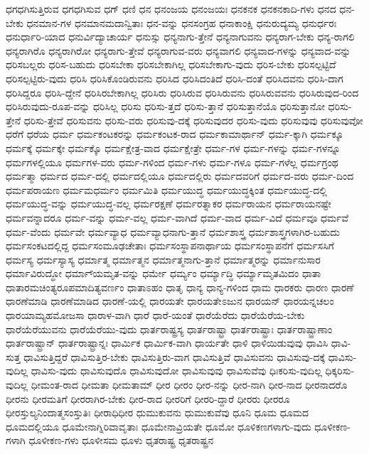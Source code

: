 {ಧಗಧಗಿಸುತ್ತಿರುವ
ಧಗಧಗಿಸುವ
ಧಗ್
ಧಣಿ
ಧನ
ಧನಂಜಯ
ಧನಂಜಯಃ
ಧನಕನಕ
ಧನಕನಕಾದಿ-ಗಳು
ಧನದ
ಧನ-ಬೇಕು
ಧನಮಾನ-ಗಳ
ಧನಮಾನಮದಾನ್ವಿತಾಃ
ಧನ-ವನ್ನು
ಧನಸಂಗ್ರಹ
ಧನಾಕಾಂಕ್ಷಿ
ಧನುರುದ್ಯಮ್ಯ
ಧನುರ್ಧರಃ
ಧನುರ್ಧಾರಿ-ಯಾದ
ಧನುರ್ವಿದ್ಯಾಚಾರ್ಯ
ಧನುಸ್ಸು
ಧನ್ಯನಾಗು-ತ್ತೇನೆ
ಧನ್ಯನಾಗುವನು
ಧನ್ಯರಾಗ-ಬೇಕು
ಧನ್ಯ-ರಾಗಲಿ
ಧನ್ಯರಾಗಿರೊ
ಧನ್ಯರಾಗಿರೋ
ಧನ್ಯರಾಗು-ತ್ತೇವೆ
ಧನ್ಯರಾಗುವ-ವರು
ಧನ್ಯವಾಗಲಿ
ಧನ್ಯವಾದ-ಗಳನ್ನು
ಧನ್ಯವಾದ-ವನ್ನು
ಧರಿಸಬಲ್ಲರು
ಧರಿಸ-ಬಹುದು
ಧರಿಸಬೇಕಾ
ಧರಿಸಬೇಕಾಗಿಲ್ಲ
ಧರಿಸಬೇಕಾಗು-ವುದು
ಧರಿಸ-ಬೇಕು
ಧರಿಸಲ್ಪಟ್ಟಿದೆ
ಧರಿಸಲ್ಪಟ್ಟಿರು-ವುದು
ಧರಿಸಿ
ಧರಿಸಿಕೊಂಡಿರುವನು
ಧರಿಸಿದ
ಧರಿಸಿದಂತಿದೆ
ಧರಿಸಿ-ದಂತೆ
ಧರಿಸಿದವನು
ಧರಿಸಿ-ದಾಗ
ಧರಿಸಿದ್ದರೂ
ಧರಿಸಿ-ದ್ದೇನೆ
ಧರಿಸಿರಬೇಕಾಗಿಲ್ಲ
ಧರಿಸಿರು
ಧರಿಸಿರುವ
ಧರಿಸಿರುವನು
ಧರಿಸಿರುವವನು
ಧರಿಸಿರುವುದ-ರಿಂದ
ಧರಿಸಿರುವುದು-ರೂಪ-ವನ್ನು
ಧರಿಸಿಲ್ಲ
ಧರಿಸು
ಧರಿಸು-ತ್ತದೆ
ಧರಿಸು-ತ್ತಾನೆ
ಧರಿಸುತ್ತಾನೆಯೊ
ಧರಿಸುತ್ತಾನೋ
ಧರಿಸು-ತ್ತೇನೆ
ಧರಿಸು-ತ್ತೇವೆ
ಧರಿಸುವನು
ಧರಿಸು-ವರು
ಧರಿಸುವು-ದಕ್ಕೆ
ಧರಿಸುವುದರ
ಧರಿಸು-ವುದು
ಧರಿಸುವುವು
ಧರಿಸುವುವೋ
ಧರೆಗೆ
ಧರೆಯ
ಧರ್ಮ
ಧರ್ಮಕಂಟಕರನ್ನು
ಧರ್ಮಕಂಟಕ-ರಾದ
ಧರ್ಮಕಾಮಾರ್ಥಾನ್
ಧರ್ಮ-ಕ್ಕಾಗಿ
ಧರ್ಮಕ್ಕೂ
ಧರ್ಮಕ್ಕೆ
ಧರ್ಮಕ್ಕೇ
ಧರ್ಮಕ್ಕೊ
ಧರ್ಮಕ್ಷೇತ್ರ-ವಾದ
ಧರ್ಮಕ್ಷೇತ್ರೇ
ಧರ್ಮ-ಗಳ
ಧರ್ಮ-ಗಳನ್ನು
ಧರ್ಮ-ಗಳನ್ನೂ
ಧರ್ಮಗಳಲ್ಲಿಯೂ
ಧರ್ಮಗಳ-ವರು
ಧರ್ಮ-ಗಳಿಂದ
ಧರ್ಮ-ಗಳು
ಧರ್ಮ-ಗಳೂ
ಧರ್ಮ-ಗಳೆಲ್ಲ
ಧರ್ಮಗ್ರಂಥ
ಧರ್ಮತ್ಮಾ
ಧರ್ಮದ
ಧರ್ಮ-ದಲ್ಲಿ
ಧರ್ಮದಲ್ಲಿಯೂ
ಧರ್ಮದಲ್ಲಿರು
ಧರ್ಮದವರಿಗೆ
ಧರ್ಮದ-ವರು
ಧರ್ಮ-ದಿಂದ
ಧರ್ಮಪರಾಯಣ
ಧರ್ಮಮಧರ್ಮಂ
ಧರ್ಮಮಿತಿ
ಧರ್ಮಯುದ್ಧ
ಧರ್ಮಯುದ್ಧಕ್ಕಿಂತ
ಧರ್ಮಯುದ್ಧ-ದಲ್ಲಿ
ಧರ್ಮಯುದ್ಧ-ವನ್ನು
ಧರ್ಮಯುದ್ಧ-ವಲ್ಲ
ಧರ್ಮರಕ್ಷಣೆ
ಧರ್ಮರತ್ನಾಕರ
ಧರ್ಮರಾಯನ
ಧರ್ಮರಾಯನಷ್ಟೇ
ಧರ್ಮವನ್ನಾದರೂ
ಧರ್ಮ-ವನ್ನು
ಧರ್ಮ-ವಲ್ಲ
ಧರ್ಮ-ವಾಗಿದೆ
ಧರ್ಮ-ವಾದ
ಧರ್ಮ-ವಿದೆ
ಧರ್ಮವೂ
ಧರ್ಮವೆ
ಧರ್ಮ-ವೆಂದು
ಧರ್ಮವೇ
ಧರ್ಮವ್ಯಾಧ
ಧರ್ಮವ್ಯಾಧನಾಗು-ತ್ತಾನೆ
ಧರ್ಮಶಾಸ್ತ್ರ
ಧರ್ಮಶಾಸ್ತ್ರಗಳಾಗಿರ-ಬಹುದು
ಧರ್ಮಸಂಕಟದಲ್ಲಿದ್ದ
ಧರ್ಮಸಂಮೂಢಚೇತಾಃ
ಧರ್ಮಸಂಸ್ಥಾಪನಾರ್ಥಾಯ
ಧರ್ಮಸಂಸ್ಥಾಪನೆಗೆ
ಧರ್ಮಸಸಿಗೆ
ಧರ್ಮಸ್ಯ
ಧರ್ಮಸ್ಯಾಸ್ಯ
ಧರ್ಮಾತ್ಮ
ಧರ್ಮಾತ್ಮನ
ಧರ್ಮಾತ್ಮನಾಗು-ತ್ತಾನೆ
ಧರ್ಮಾತ್ಮರನ್ನು
ಧರ್ಮಾನುಸಾರ
ಧರ್ಮಾವಿರುದ್ಧೋ
ಧರ್ಮಾ್ಯಮೃತ-ವನ್ನು
ಧರ್ಮೇ
ಧರ್ಮ್ಯಂ
ಧರ್ಮ್ಯಾದ್ಧಿ
ಧರ್ಮ್ಯಾಮೃತಮಿದಂ
ಧಾತಾ
ಧಾತಾರಮಚಿಂತ್ಯರೂಪಮಾದಿತ್ಯವರ್ಣಂ
ಧಾತಾಽಹಂ
ಧಾತೃ
ಧಾನ್ಯ
ಧಾನ್ಯ-ಗಳಿಂದ
ಧಾಮ
ಧಾರಕರು
ಧಾರಣ
ಧಾರಣೆ
ಧಾರಣೆಮಾಡಿ
ಧಾರಣೆಮಾಡಿದ
ಧಾರಣೆ-ಯಲ್ಲಿ
ಧಾರಯತೇ
ಧಾರಯತೇಽಜುನ
ಧಾರಯನ್
ಧಾರಯನ್ನಚಲಂ
ಧಾರಯಾಮ್ಯಹಮೋಜಸಾ
ಧಾರಾಳ-ವಾಗಿ
ಧಾರೆ
ಧಾರೆ-ಯಂತೆ
ಧಾರೆಯೆರೆದು
ಧಾರೆಯೆರೆಯ-ಬೇಕು
ಧಾರೆಯೆರೆಯುವನು
ಧಾರೆಯೆರೆಯು-ವುದು
ಧಾರ್ತರಾಷ್ಟ್ರಸ್ಯ
ಧಾರ್ತರಾಷ್ಟ್ರಾ
ಧಾರ್ತರಾಷ್ಟ್ರಾಃ
ಧಾರ್ತರಾಷ್ಟ್ರಾಣಾಂ
ಧಾರ್ತರಾಷ್ಟ್ರಾನ್
ಧಾರ್ತರಾಷ್ಟ್ರಾನ್ನಃ
ಧಾರ್ಮಿಕ
ಧಾರ್ಮಿಕ-ವಾಗಿ
ಧಾರ್ಯತೇ
ಧಾಳಿ
ಧಾಳಿಯಿಡುವುವು
ಧಾವಿಸಿ
ಧಾವಿ-ಸುತ್ತ
ಧಾವಿಸುತ್ತಿದ್ದರೆ
ಧಾವಿಸುತ್ತಿರ-ಬೇಕು
ಧಾವಿಸುತ್ತಿರು-ವಾಗ
ಧಾವಿಸುತ್ತಿವೆ
ಧಾವಿಸುವನು
ಧಾವಿಸುವು-ದಕ್ಕೆ
ಧಾವಿಸು-ವುದಿಲ್ಲ
ಧಾವಿಸು-ವುದು
ಧಾವಿಸುವುದೊ
ಧಾವಿಸುವುದೋ
ಧಾವಿಸುವುವು
ಧಾವಿಸುವೆವು
ಧಿಃಕರಿಸು-ವುದಿಲ್ಲ
ಧಿಕ್ಕರಿಸು-ವುದಿಲ್ಲ
ಧೀಮಂತ-ರಾದ
ಧೀಮತಾ
ಧೀಮತಾಮ್
ಧೀರ
ಧೀರಂ
ಧೀರ-ನನ್ನು
ಧೀರ-ನಾಗಿ
ಧೀರ-ನಾದ
ಧೀರನಾದರೊ
ಧೀರನು
ಧೀರಮತಿಗೆ
ಧೀರರಾಗಿರ-ಬೇಕು
ಧೀರ-ರಾದ
ಧೀರರಿಗೆ
ಧೀರರಿ-ದ್ದಾರೆ
ಧೀರರು
ಧೀರರೂ
ಧೀರಸ್ತುಲ್ಯನಿಂದಾತ್ಮಸಂಸ್ತುತಿಃ
ಧೀರಾಧಿಧೀರ
ಧುಮುಕುವನು
ಧುಮುಕುವೆವು
ಧೂನಿ
ಧೂಮ
ಧೂಮದ
ಧೂಮದಲ್ಲಿಯೂ
ಧೂಮೇನಾಗ್ನಿರಿವಾವೃತಾಃ
ಧೂಮೇನಾವ್ರಿಯತೇ
ಧೂಮೋ
ಧೂಳಿಕಣಗಳಾಗು-ವುದು
ಧೂಳೀಕಣ-ಗಳಾಗಿ
ಧೂಳೀಕಣ-ಗಳು
ಧೂಳೀಸಮ
ಧೂಳು
ಧೃತರಾಷ್ಟ್ರ
ಧೃತರಾಷ್ಟ್ರನ
}
